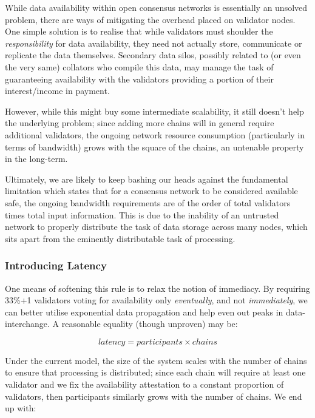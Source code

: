 \documentclass[9pt,oneside]{amsart}
\begin{document}
\begin{multicols}{2}
 While data availability within open consensus networks is essentially an unsolved problem, there are ways of mitigating the overhead placed on validator nodes. One simple solution is to realise that while validators must shoulder the \emph{responsibility} for data availability, they need not actually store, communicate or replicate the data themselves. Secondary data silos, possibly related to (or even the very same) collators who compile this data, may manage the task of guaranteeing availability with the validators providing a portion of their interest/income in payment.

 However, while this might buy some intermediate scalability, it still doesn't help the underlying problem; since adding more chains will in general require additional validators, the ongoing network resource consumption (particularly in terms of bandwidth) grows with the square of the chains, an untenable property in the long-term.

 Ultimately, we are likely to keep bashing our heads against the fundamental limitation which states that for a consensus network to be considered available safe, the ongoing bandwidth requirements are of the order of total validators times total input information. This is due to the inability of an untrusted network to properly distribute the task of data storage across many nodes, which sits apart from the eminently distributable task of processing.

\subsubsection{Introducing Latency}

 One means of softening this rule is to relax the notion of immediacy. By
requiring 33\%+1 validators voting for availability only
\emph{eventually}, and not \emph{immediately}, we can better utilise
 exponential data propagation and help even out peaks in data-interchange. A reasonable equality (though unproven) may be:

\begin{equation}
latency = participants \times chains
\end{equation}

 Under the current model, the size of the system scales with the number of chains to ensure that processing is distributed; since each chain will require at least one validator and we fix the availability attestation to a constant proportion of validators, then participants similarly grows with the number of chains. We end up with:


\end{multicols}
\end{document}
